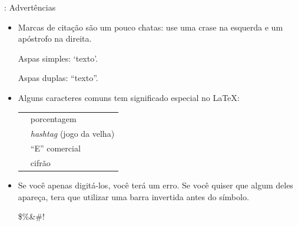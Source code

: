 \documentclass{beamer}
\begin{document}
\begin{frame}[fragile]{\insertsubsection{}: Advertências}
\small
\begin{itemize}
\item Marcas de citação são um pouco chatas: use uma
crase  na esquerda e um apóstrofo 
 na direita.
\begin{exampletwouptiny}
Aspas simples: `texto'.

Aspas duplas: ``texto''.
\end{exampletwouptiny}

\item Alguns caracteres comuns tem significado especial no  \LaTeX:\\[1ex]
\begin{tabular}{cl}
\keystrokebftt{\%} & porcentagem              \\
\keystrokebftt{\#} & \emph{hashtag} (jogo da velha) \\
\keystrokebftt{\&} & ``E'' comercial                 \\
\keystrokebftt{\$} & cifrão               \\
\end{tabular}
\item Se você apenas digitá-los, você terá um erro. Se você quiser que algum
deles apareça, tera que utilizar uma barra invertida antes do símbolo.
\begin{exampletwoup}
\$\%\&\#!
\end{exampletwoup}
\end{itemize}
\end{frame}
\end{document}
